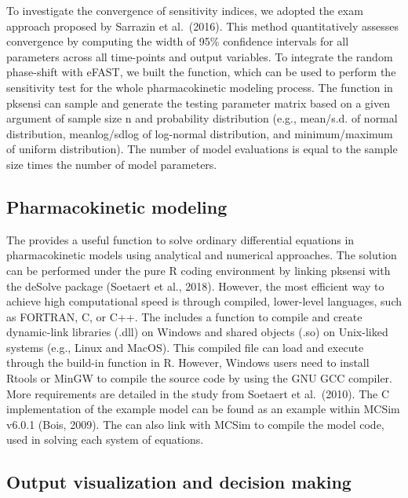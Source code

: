 \documentclass[article]{jss}
\begin{document}
To investigate the convergence of sensitivity indices, we adopted the
exam approach proposed by Sarrazin et al.~(2016). This method
quantitatively assesses convergence by computing the width of 95\%
confidence intervals for all parameters across all time-points and
output variables. To integrate the random phase-shift with eFAST, we
built the  function, which can be used to perform the
sensitivity test for the whole pharmacokinetic modeling process. The
function  in pksensi can sample and generate the
testing parameter matrix based on a given argument of sample size n and
probability distribution (e.g., mean/s.d. of normal distribution,
meanlog/sdlog of log-normal distribution, and minimum/maximum of uniform
distribution). The number of model evaluations is equal to the sample
size times the number of model parameters.

\hypertarget{pharmacokinetic-modeling}{%
\subsection{Pharmacokinetic modeling}\label{pharmacokinetic-modeling}}

The  provides a useful function to solve ordinary
differential equations in pharmacokinetic models using analytical and
numerical approaches. The solution can be performed under the pure R
coding environment by linking pksensi with the deSolve package (Soetaert
et al., 2018). However, the most efficient way to achieve high
computational speed is through compiled, lower-level languages, such as
FORTRAN, C, or C++. The  includes a function to compile and
create dynamic-link libraries (.dll) on Windows and shared objects (.so)
on Unix-liked systems (e.g., Linux and MacOS). This compiled file can
load and execute through the build-in function in R. However, Windows
users need to install Rtools or MinGW to compile the source code by
using the GNU GCC compiler. More requirements are detailed in the study
from Soetaert et al.~(2010). The C implementation of the example model
can be found as an example within MCSim v6.0.1 (Bois, 2009). The
 can also link with MCSim to compile the model code, used
in solving each system of equations.

\hypertarget{output-visualization-and-decision-making}{%
\subsection{Output visualization and decision
making}\label{output-visualization-and-decision-making}}
\end{document}
